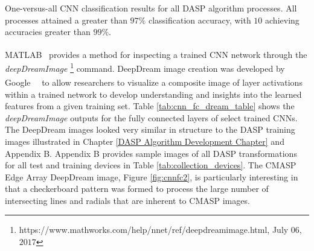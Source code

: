 \begin{table}[tb]
	\caption{One-versus-all CNN classification results for all DASP algorithm processes.  All processes attained a greater than $97\%$ classification accuracy, with $10$ achieving accuracies greater than $99\%$.}
	\centering
	\label{tab:cnn_single_results}
\end{table}

MATLAB\textsuperscript \textregistered ~ provides a method for inspecting a trained CNN network through the \textit{deepDreamImage} \footnote{https://www.mathworks.com/help/nnet/ref/deepdreamimage.html, July $06$, $2017$} command.  DeepDream image creation was developed by Google\textsuperscript \textregistered ~~ \cite{Mordvintsev2015} to allow researchers to visualize a composite image of layer activations within a trained network to develop understanding and insights into the learned features from a given training set.  Table \ref{tab:cnn_fc_dream_table} shows the \textit{deepDreamImage} outputs for the fully connected layers of select trained CNNs.  The DeepDream images looked very similar in structure to the DASP training images illustrated in Chapter \ref{DASP Algorithm Development Chapter} and Appendix B.  Appendix B provides sample images of all DASP transformations for all test and training devices in Table \ref{tab:collection_devices}.  The CMASP Edge Array DeepDream image, Figure \ref{fig:cnnfc2}, is particularly interesting in that a checkerboard pattern was formed to process the large number of intersecting lines and radials that are inherent to CMASP images.

